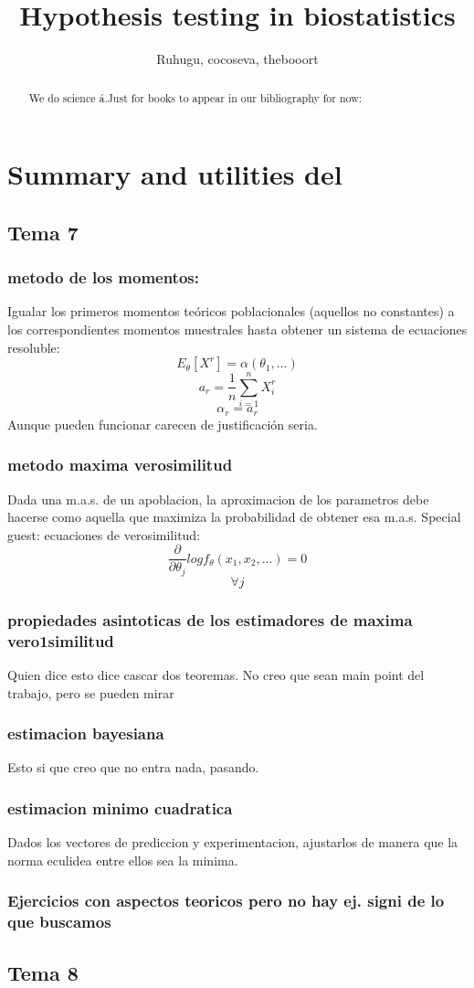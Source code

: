 \documentclass[a4paper,12pt]{article}
\title{Hypothesis testing in biostatistics}
\author{Ruhugu, cocoseva, thebooort}
\begin{document}
\maketitle

\begin{abstract}
We do science á.Just for books to appear in our bibliography for now:
\cite{velez1993principios} \cite{rosner2015fundamentals}
\end{abstract}

\section{Summary and utilities del \cite{velez1993principios} }
\subsection{Tema 7}
\subsubsection{metodo de los momentos:}
Igualar los primeros momentos teóricos poblacionales (aquellos no constantes) a los correspondientes momentos muestrales hasta obtener un sistema de ecuaciones resoluble:
$$E_\theta[X^r]=\alpha(\theta_1,...)$$
$$a_r=\frac{1}{n}\sum_{i=1}^{n}X_i^r$$
$$\alpha_r=a_r $$
Aunque pueden funcionar carecen de justificación seria.
\subsubsection{metodo maxima verosimilitud}
Dada una m.a.s. de un apoblacion, la aproximacion de los parametros debe hacerse como aquella que maximiza la probabilidad de obtener esa m.a.s.
Special guest: ecuaciones de verosimilitud:
$$\frac{\partial}{\partial\theta_j}log f_\theta(x_1,x_2,...)=0$$
$$\forall j$$
\subsubsection{propiedades asintoticas de los estimadores de maxima vero1similitud}
Quien dice esto dice cascar dos teoremas. No creo que sean main point del trabajo, pero se pueden mirar
\subsubsection{estimacion bayesiana}
Esto si que creo que no entra nada, pasando.
\subsubsection{estimacion minimo cuadratica}
Dados los vectores de prediccion y experimentacion, ajustarlos de manera que la norma eculidea entre ellos sea la minima. 
\subsubsection{Ejercicios con aspectos teoricos pero no hay ej. signi de lo que buscamos}
\subsection{Tema 8}














\end{document}
